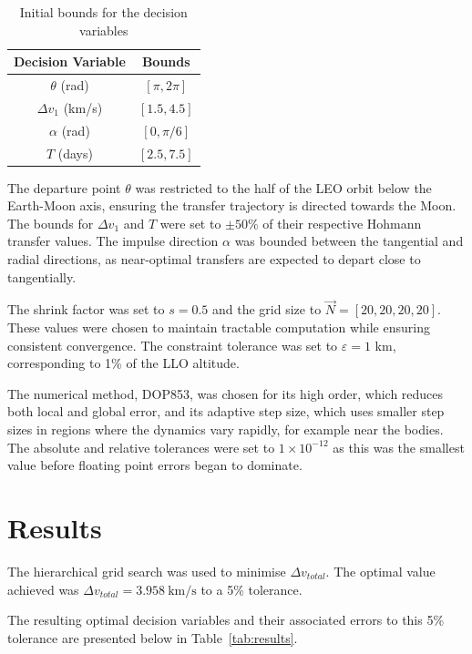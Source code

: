 \documentclass[10pt,twocolumn]{revtex4-2}    %
\begin{document}
\begin{table}[h]
    \centering
    \begin{tabular}{cc}
        \toprule
        \textbf{Decision Variable} & \textbf{Bounds} \\
        \midrule
        $\theta$ (rad)            & $[\pi, 2\pi]$ \\[6pt]
        $\Delta v_1$ (km/s) & $[1.5, 4.5]$ \\[6pt]
        $\alpha$ (rad)            & $[0, \pi/6]$ \\[6pt]
        $T$ (days)                & $[2.5, 7.5]$ \\[6pt]
        \bottomrule
    \end{tabular}
    \caption{Initial bounds for the decision variables}
    \label{tab:bounds}
\end{table}

The departure point $\theta$ was restricted to the half of the LEO orbit below the Earth-Moon axis, ensuring the transfer trajectory is directed towards the Moon. The bounds for $\Delta v_{1}$ and $T$ were set to $\pm 50\%$ of their respective Hohmann transfer values. The impulse direction $\alpha$ was bounded between the tangential and radial directions, as near-optimal transfers are expected to depart close to tangentially. 

The shrink factor was set to $s = 0.5$ and the grid size to $\vec{N} = [20, 20, 20, 20]$. These values were chosen to maintain tractable computation while ensuring consistent convergence. The constraint tolerance was set to $\varepsilon = 1$ km, corresponding to 1\% of the LLO altitude.

The numerical method, DOP853, was chosen for its high order, which reduces both local and global error, and its adaptive step size, which uses smaller step sizes in regions where the dynamics vary rapidly, for example near the bodies. The absolute and relative tolerances were set to $1 \times 10^{-12}$ as this was the smallest value before floating point errors began to dominate.

\section{Results} 
\label{sec:Results}

The hierarchical grid search was used to minimise $\Delta v_{total}$. The optimal value achieved was $\Delta v_{total} = 3.958~\mathrm{km/s}$ to a 5\% tolerance.

The resulting optimal decision variables and their associated errors to this 5\% tolerance are presented below in Table~\ref{tab:results}.
\end{document}
